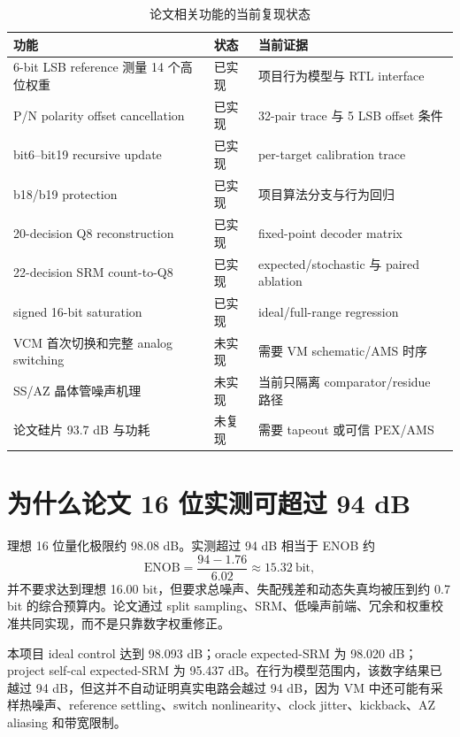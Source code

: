 \documentclass[UTF8,fontset=none,a4paper,11pt,openany]{ctexrep}
\begin{document}
\begin{table}[H]
\centering
\caption{论文相关功能的当前复现状态}
\label{tab:paper-distance}
\begin{tabularx}{\textwidth}{Xp{}X}
\toprule
功能 & 状态 & 当前证据\\
\midrule
6-bit LSB reference 测量 14 个高位权重 & 已实现 & 项目行为模型与 RTL interface\\
P/N polarity offset cancellation & 已实现 & 32-pair trace 与 5 LSB offset 条件\\
bit6--bit19 recursive update & 已实现 & per-target calibration trace\\
b18/b19 protection & 已实现 & 项目算法分支与行为回归\\
20-decision Q8 reconstruction & 已实现 & fixed-point decoder matrix\\
22-decision SRM count-to-Q8 & 已实现 & expected/stochastic 与 paired ablation\\
signed 16-bit saturation & 已实现 & ideal/full-range regression\\
VCM 首次切换和完整 analog switching & 未实现 & 需要 VM schematic/AMS 时序\\
SS/AZ 晶体管噪声机理 & 未实现 & 当前只隔离 comparator/residue 路径\\
论文硅片 93.7 dB 与功耗 & 未复现 & 需要 tapeout 或可信 PEX/AMS\\
\bottomrule
\end{tabularx}
\end{table}

\section{为什么论文 16 位实测可超过 94 dB}

理想 16 位量化极限约 98.08 dB。实测超过 94 dB 相当于 ENOB 约
\begin{equation}
\mathrm{ENOB}=\frac{94-1.76}{6.02}\approx15.32~\mathrm{bit},
\end{equation}
并不要求达到理想 16.00 bit，但要求总噪声、失配残差和动态失真均被压到约 0.7 bit 的综合预算内。论文通过 split sampling、SRM、低噪声前端、冗余和权重校准共同实现，而不是只靠数字权重修正。

本项目 ideal control 达到 98.093 dB；oracle expected-SRM 为 98.020 dB；project self-cal expected-SRM 为 95.437 dB。在行为模型范围内，该数字结果已越过 94 dB，但这并不自动证明真实电路会越过 94 dB，因为 VM 中还可能有采样热噪声、reference settling、switch nonlinearity、clock jitter、kickback、AZ aliasing 和带宽限制。
\end{document}
